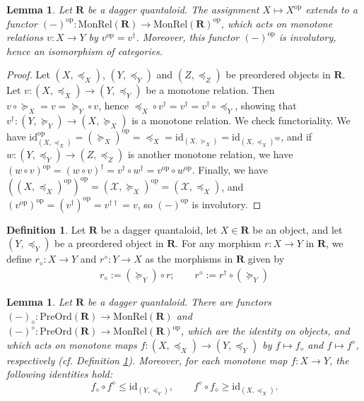 \documentclass[12pt]{tac}
\newtheorem{lemma}[theorem]{Lemma}
\theoremstyle{definition}
\newtheorem{definition}[theorem]{Definition}
\theoremstyle{remark}
\newcommand{\X}{\mathcal X}
\newcommand{\qo}{{\boldsymbol{\preccurlyeq}}}
\newcommand{\qop}{{\boldsymbol{\succcurlyeq}}}
\newcommand{\<}{\langle}
\renewcommand{\>}{\rangle}
\renewcommand{\:}{\colon}
\newcommand{\op}{\mathrm{op}}
\newcommand{\id}{\mathrm{id}}
\begin{document}
\begin{lemma} Let $\mathbf R$ be a dagger quantaloid. The assignment $X\mapsto X^\op$ extends to a functor $(-)^{\op}:\mathrm{MonRel}(\mathbf R)\to\mathrm{MonRel}(\mathbf R)^\op$, which acts on monotone relations $v:X\to Y$ by $v^\op=v^\dag$. Moreover, this functor $(-)^\op$ is involutory, hence an isomorphism of categories.
\end{lemma}
\begin{proof}
    Let $(X,\qo_X)$, $(Y,\qo_Y)$ and $(Z,\qo_Z)$ be preordered objects in $\mathbf R$. Let $v:(X,\qo_X)\to(Y,\qo_Y)$ be a monotone relation. Then $v\circ \qop_X=v=\qop_Y\circ v$, hence $\qo_X\circ v^\dag=v^\dag=v^\dag\circ \qo_Y$, showing that $v^\dag:(Y,\qop_Y)\to (X,\qop_X)$ is a monotone relation. We check functoriality. We have $\id_{(X,\qo_X)}^\op=(\qop_X)^\op=\qo_X=\id_{(X,\qop_X)}=\id_{(X,\qo_X)^\op}$, and if $w:(Y,\qo_Y)\to(Z,\qo_Z)$ is another monotone relation, we have $(w\circ v)^\op=(w\circ v)^\dag=v^\dag\circ w^\dag=v^\op\circ w^\op$.
    Finally, we have $((X,\qo_X)^{\op})^\op=(\X,\qop_X)^\op=(\X,\qo_X)$, and $(v^{\op})^\op=(v^\dag)^\op=v^{\dag\dag}=v$, so $(-)^\op$ is involutory.
\end{proof}


\begin{definition}\label{def:diamond}
    Let $\mathbf R$ be a dagger quantaloid, let $X\in\mathbf R$ be an object, and let  $(Y,\qo_Y)$ be a preordered object in $\mathbf R$. For any morphism $r:X\to Y$ in $\mathbf R$, we define $r_\diamond:X\to Y$ and $r^\diamond:Y\to X$ as the morphisms in $\mathbf R$ given by 
    \begin{align*}
        r_\diamond :=( \qop_Y)\circ r;\qquad
        r^\diamond  := r^\dag\circ(\qop_Y)
    \end{align*}
\end{definition}

\begin{lemma}\label{lem:embedding qPOS into qRelPos}
Let $\mathbf R$ be a dagger quantaloid. There are functors $(-)_\diamond:\mathrm{PreOrd}(\mathbf R)\to\mathrm{MonRel}(\mathbf R)$ and $(-)^\diamond:\mathrm{PreOrd}(\mathbf R)\to\mathrm{MonRel}(\mathbf R)^\op$, which are the identity on objects, and which acts on monotone maps $f:(X,\qo_X)\to(Y,\qo_Y)$ by $f\mapsto f_\diamond$ and $f\mapsto f^\diamond$, respectively (cf. Definition \ref{def:diamond}). Moreover, for each monotone map $f:X\to Y$, the following identities hold:
\[f_\diamond\circ f^\diamond\leq\id_{(Y,\qo_Y)},\qquad f^\diamond\circ f_\diamond\geq \id_{(X,\qo_X)}.\]
\end{lemma}
\end{document}
